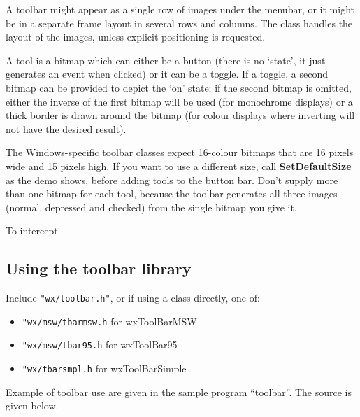 A toolbar might appear as a single row of images under
the menubar, or it might be in a separate frame layout in several rows
and columns. The class handles the layout of the images, unless explicit
positioning is requested.

A tool is a bitmap which can either be a button (there is no `state',
it just generates an event when clicked) or it can be a toggle. If a
toggle, a second bitmap can be provided to depict the `on' state; if
the second bitmap is omitted, either the inverse of the first bitmap
will be used (for monochrome displays) or a thick border is drawn
around the bitmap (for colour displays where inverting will not have
the desired result).

The Windows-specific toolbar classes expect 16-colour bitmaps that are 16 pixels wide and 15 pixels
high. If you want to use a different size, call {\bf SetDefaultSize}\rtfsp
as the demo shows, before adding tools to the button bar. Don't supply more than
one bitmap for each tool, because the toolbar generates all three images (normal,
depressed and checked) from the single bitmap you give it.

To intercept

\subsection{Using the toolbar library}

Include {\tt "wx/toolbar.h"}, or if using a class directly, one of:

\begin{itemize}\itemsep=0pt
\item {\tt "wx/msw/tbarmsw.h} for wxToolBarMSW
\item {\tt "wx/msw/tbar95.h} for wxToolBar95
\item {\tt "wx/tbarsmpl.h} for wxToolBarSimple
\end{itemize}

Example of toolbar use are given in the sample program ``toolbar''. The
source is given below.

